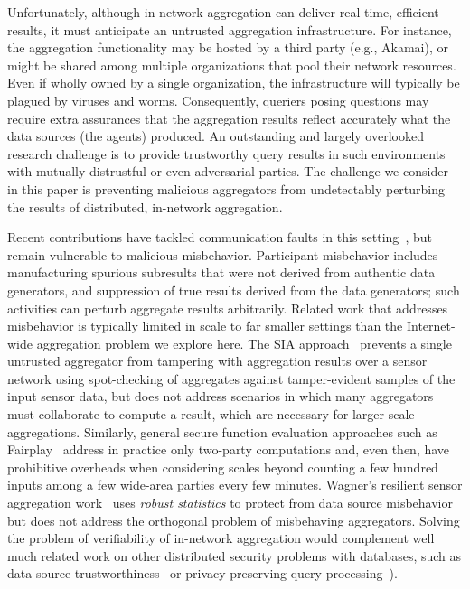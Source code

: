 \documentclass[10pt,twocolumn]{article}
\newcommand\vpar{{\vspace*{0.3em}}}
\newcommand{\stitle}[1]{\vpar\noindent{\bf #1\/}}
\begin{document}
Unfortunately, although in-network aggregation can deliver real-time,
efficient results, it must anticipate an untrusted aggregation
infrastructure.  For instance, the aggregation functionality may be
hosted by a third party (e.g., Akamai), or might be shared
among multiple organizations that pool their network
resources.  Even if wholly owned by a single organization, the
infrastructure will typically be plagued by viruses and worms.
Consequently, queriers
posing questions may require extra assurances that the
aggregation results reflect accurately what the data sources
(the agents) produced. An outstanding and largely overlooked research
challenge is to provide
trustworthy query results in such environments with mutually distrustful or
even adversarial parties. 
The challenge we consider in this paper is preventing malicious
aggregators from
undetectably perturbing the results of distributed, in-network
aggregation.

\stitle{Prior Work.}
Recent contributions have tackled 
communication faults in this
setting~\cite{Madden2002,Considine2004,Manjhi2005}, but 
remain vulnerable to malicious misbehavior.  Participant misbehavior
includes manufacturing
spurious subresults that were not derived from authentic data generators, and
suppression of true results derived from the data generators; such activities
can perturb aggregate results arbitrarily.  Related work that addresses
misbehavior is typically limited in scale to far smaller settings than
the Internet-wide aggregation problem we explore here.  The
SIA approach~\cite{Przydatek2003} prevents a single untrusted aggregator
from tampering with aggregation results over a sensor network using
spot-checking of aggregates against tamper-evident samples of the input
sensor data, but does not address scenarios in which many aggregators
must collaborate to compute a result, which are necessary for
larger-scale aggregations. Similarly, general secure function evaluation
approaches such as Fairplay~\cite{Malkhi2004} address in practice only
two-party computations and, even then, have prohibitive overheads when
considering scales beyond counting a few hundred inputs among
a few wide-area parties every few minutes.  Wagner's resilient sensor
aggregation work~\cite{Wagner2004} uses \emph{robust statistics} to
protect from 
data source misbehavior but does not address the
orthogonal problem of misbehaving aggregators. Solving the problem of
verifiability of in-network aggregation would complement well much
related work on other distributed security problems with databases, such
as data source trustworthiness~\cite{AgrawalHaasKiernan2004} or
privacy-preserving
query processing~\cite{AgrawalSrikantThomas2005}).  
\end{document}
